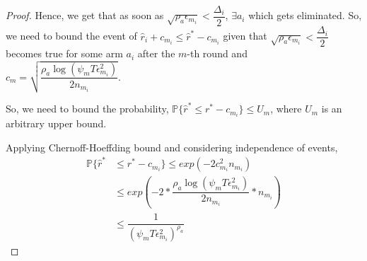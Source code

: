 \begin{proof}
  Hence, we get that as soon as $\sqrt{\rho_{a}\epsilon_{m_{i}}}<\dfrac{\Delta_{i}}{2}$, $\exists a_{i}$ which gets eliminated.
  So, we need to bound the event of $\hat{r}_{i}+c_{m_{i}}\leq \hat{r}^{*}-c_{m_{i}}$ given that $\sqrt{\rho_{a}\epsilon_{m_{i}}}<\dfrac{\Delta_{i}}{2}$ becomes true for some arm $a_{i}$ after the $m$-th round and $c_{m}=\sqrt{\dfrac{\rho_{a}\log (\psi_{m}T\epsilon_{m_{i}}^{2})}{2 n_{m_{i}}}}$.

% 
	So, we need to bound the probability,
 \hspace*{4em} $\mathbb{P}\lbrace\hat{r}^{*}\leq r^{*} - c_{m_{i}}\rbrace\leq U_{m}$, where $U_{m}$ is an  arbitrary upper bound.
 
% 
Applying Chernoff-Hoeffding bound and considering independence of events,
  \begin{align*}
\mathbb{P}\lbrace\hat{r}^{*}&\leq r^{*} - c_{m_{i}}\rbrace\leq exp(-2c_{m_{i}}^{2}n_{m_{i}})\\
&\leq exp(-2 * \dfrac{\rho_{a}\log (\psi_{m}T\epsilon_{m_{i}}^{2})}{2 n_{m_{i}}} *n_{m_{i}})\\
&\leq \dfrac{1}{(\psi_{m}T\epsilon_{m_{i}}^{2})^{\rho_{a}}}   
  \end{align*}
 

\end{proof}
